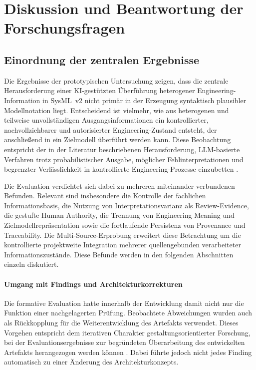 
\section{Diskussion und Beantwortung der Forschungsfragen}
\label{sec:discussion}

\subsection{Einordnung der zentralen Ergebnisse}
\label{sec:discussion_overview}

Die Ergebnisse der prototypischen Untersuchung zeigen, dass die zentrale
Herausforderung einer KI-gestützten Überführung heterogener
Engineering-Information in SysML~v2 nicht primär in der Erzeugung syntaktisch
plausibler Modellnotation liegt. Entscheidend ist vielmehr, wie aus
heterogenen und teilweise unvollständigen Ausgangsinformationen ein
kontrollierter, nachvollziehbarer und autorisierter Engineering-Zustand
entsteht, der anschließend in ein Zielmodell überführt werden kann.
Diese Beobachtung entspricht der in der Literatur beschriebenen Herausforderung,
LLM-basierte Verfahren trotz probabilistischer Ausgabe, möglicher
Fehlinterpretationen und begrenzter Verlässlichkeit in kontrollierte
Engineering-Prozesse einzubetten \cite{Topcu2025,Souza.2026}.

Die Evaluation verdichtet sich dabei zu mehreren miteinander verbundenen
Befunden. Relevant sind insbesondere die Kontrolle der fachlichen
Informationsbasis, die Nutzung von Interpretationsvarianz als Review-Evidence,
die gestufte Human Authority, die Trennung von Engineering Meaning und
Zielmodellrepräsentation sowie die fortlaufende Persistenz von Provenance und
Traceability. Die Multi-Source-Erprobung erweitert diese Betrachtung um die
kontrollierte projektweite Integration mehrerer quellengebunden verarbeiteter
Informationszustände. Diese Befunde werden in den folgenden Abschnitten
einzeln diskutiert.

\paragraph{Umgang mit Findings und Architekturkorrekturen}

Die formative Evaluation hatte innerhalb der Entwicklung damit nicht nur die
Funktion einer nachgelagerten Prüfung. Beobachtete Abweichungen wurden auch als
Rückkopplung für die Weiterentwicklung des Artefakts verwendet. Dieses Vorgehen
entspricht dem iterativen Charakter gestaltungsorientierter Forschung, bei der
Evaluationsergebnisse zur begründeten Überarbeitung des entwickelten Artefakts
herangezogen werden können \cite{Wieringa2014}. Dabei führte jedoch nicht jedes
Finding automatisch zu einer Änderung des Architekturkonzepts.

